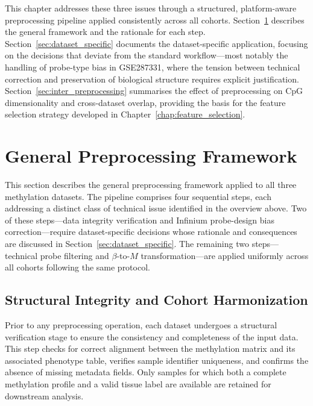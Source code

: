 This chapter addresses these three issues through a structured, 
platform-aware preprocessing pipeline applied consistently across all 
cohorts. Section~\ref{sec:pipeline} describes the general framework and 
the rationale for each step. Section~\ref{sec:dataset_specific} documents 
the dataset-specific application, focusing on the decisions that deviate 
from the standard workflow---most notably the handling of probe-type bias 
in GSE287331, where the tension between technical correction and 
preservation of biological structure requires explicit justification. 
Section~\ref{sec:inter_preprocessing} summarises the effect of 
preprocessing on CpG dimensionality and cross-dataset overlap, providing 
the basis for the feature selection strategy developed in Chapter~\ref{chap:feature_selection}.

\section{General Preprocessing Framework}
\label{sec:pipeline}

This section describes the general preprocessing framework applied to all 
three methylation datasets. The pipeline comprises four sequential steps, 
each addressing a distinct class of technical issue identified in the 
overview above. Two of these steps—data integrity verification and 
Infinium probe-design bias correction—require dataset-specific decisions 
whose rationale and consequences are discussed in 
Section~\ref{sec:dataset_specific}. The remaining two steps—technical 
probe filtering and $\beta$-to-$M$ transformation—are applied uniformly 
across all cohorts following the same protocol.

\subsection{Structural Integrity and Cohort Harmonization}
\label{subsec:step0}

Prior to any preprocessing operation, each dataset undergoes a structural 
verification stage to ensure the consistency and completeness of the input 
data. This step checks for correct alignment between the methylation matrix 
and its associated phenotype table, verifies sample identifier uniqueness, 
and confirms the absence of missing metadata fields. Only samples for which 
both a complete methylation profile and a valid tissue label are available 
are retained for downstream analysis.

